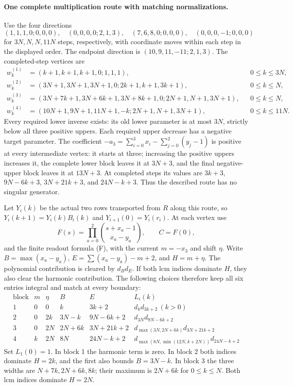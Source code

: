 \documentclass[11pt]{article}
\begin{document}
\paragraph{One complete multiplication route with matching normalizations.}
Use the four directions
\[
 (1,1,1,0;0,0,0),\quad(0,0,0,0;2,1,3),\quad
 (7,6,8,0;0,0,0),\quad(0,0,0,-1;0,0,0)
\]
for $3N,N,N,11N$ steps, respectively, with coordinate moves within
each step in the displayed order. The endpoint direction is
$(10,9,11,-11;2,1,3)$.
The completed-step vertices are
\[
\begin{aligned}
 w^{(1)}_k&=(k+1,k+1,k+1,0;1,1,1), &&0\le k\le3N,\\
 w^{(2)}_k&=(3N+1,3N+1,3N+1,0;2k+1,k+1,3k+1),&&0\le k\le N,\\
 w^{(3)}_k&=(3N+7k+1,3N+6k+1,3N+8k+1,0;
                2N+1,N+1,3N+1),&&0\le k\le N,\\
 w^{(4)}_k&=(10N+1,9N+1,11N+1,-k;2N+1,N+1,3N+1),&&0\le k\le11N.
\end{aligned}
\]
Every required lower inverse exists: its old lower parameter is at
most $3N$, strictly below all three positive uppers. Each required
upper decrease has a negative target parameter.
The coefficient $-a_3=\sum_{i=0}^3 x_i-\sum_{j=0}^2(y_j-1)$ is positive at every
intermediate vertex: it starts at three; increasing the positive
uppers increases it, the complete lower block leaves it at $3N+3$,
and the final negative-upper block leaves it at $13N+3$.
At completed steps its values are
$3k+3$, $9N-6k+3$, $3N+21k+3$, and $24N-k+3$.
Thus the described route has no singular generator.

Let $Y_i(k)$ be the actual two rows transported from $R$ along this
route, so $Y_i(k+1)=Y_i(k)B_i(k)$ and $Y_{i+1}(0)=Y_i(r_i)$.
At each vertex use
\[
 F(s)=\prod_{a=0}^2\binom{s+x_a-1}{x_a-y_a},\qquad C=F(0),
\]
and the finite readout formula (F), with the current $m=-x_3$ and
shift $\eta$. Write $B=\max(x_a-y_a)$, $E=\sum(x_a-y_a)-m+2$,
and $H=m+\eta$. The polynomial contribution is cleared by $d_Bd_E$.
If both lcm indices dominate $H$, they also clear the harmonic
contribution. The following choices therefore keep all six entries
integral and match at every boundary:
\[
\begin{array}{c|c|c|c|c|c}
\text{block}&m&\eta&B&E&L_i(k)\\\hline
1&0&0&k&3k+2&d_kd_{3k+2}\ (k>0)\\
2&0&2k&3N-k&9N-6k+2&d_{3N}d_{9N-6k+2}\\
3&0&2N&2N+6k&3N+21k+2&d_{\max(3N,2N+6k)}d_{3N+21k+2}\\
4&k&2N&8N&24N-k+2&d_{\max(8N,\min(12N,k+2N))}d_{24N-k+2}
\end{array}
\]
Set $L_1(0)=1$. In block 1 the harmonic term is zero.
In block 2 both indices dominate $H=2k$, and the first also
bounds $B=3N-k$.
In block 3 the three widths are
$N+7k,2N+6k,8k$; their maximum is $2N+6k$ for $0\le k\le N$.
Both lcm indices dominate $H=2N$.
\end{document}
